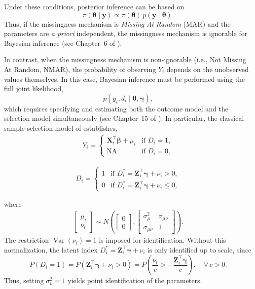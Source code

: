 Under these conditions, posterior inference can be based on
\[
\pi(\boldsymbol{\theta}\mid \mathbf{y}) 
\propto \pi(\boldsymbol{\theta})\, p(\mathbf{y} \mid \boldsymbol{\theta}).
\]
Thus, if the missingness mechanism is \textit{Missing At Random} (MAR) and the parameters are \emph{a priori} independent, the missingness mechanism is ignorable for Bayesian inference (see Chapter~6 of \cite{little2019statistical}).

In contrast, when the missingness mechanism is non-ignorable (i.e., Not Missing At Random, NMAR), the probability of observing $Y_i$ depends on the unobserved values themselves. In this case, Bayesian inference must be performed using the full joint likelihood,
\[
p(y_i, d_i \mid \boldsymbol{\theta},\boldsymbol{\gamma}),
\]
which requires specifying and estimating both the outcome model and the selection model simultaneously (see Chapter~15 of \cite{little2019statistical}). In particular, the classical sample selection model of \cite{heckman1979sample} establishes,
\begin{align*}
	Y_i = \begin{cases}
		\mathbf{X}_i^{\top}\boldsymbol{\beta}+\mu_i & \text{if } D_i=1, \\
		\text{NA} & \text{if } D_i=0,
	\end{cases}
\end{align*}

\begin{align*}
	D_i = \begin{cases}
		1 & \text{if } D_i^* = \mathbf{Z}_i^{\top}\boldsymbol{\gamma}+\nu_i > 0, \\
		0 & \text{if } D_i^* = \mathbf{Z}_i^{\top}\boldsymbol{\gamma}+\nu_i \leq 0,
	\end{cases}
\end{align*}

where
\begin{align}
	\begin{bmatrix}
		\mu_i \\[6pt]
		\nu_i
	\end{bmatrix}
	\sim N\!\left(
	\begin{bmatrix}
		0 \\ 0
	\end{bmatrix},
	\begin{bmatrix}
		\sigma^2_{\mu} & \sigma_{\mu\nu} \\
		\sigma_{\mu\nu} & 1
	\end{bmatrix}\right).
\end{align}
The restriction $\operatorname{Var}(\nu_i)=1$ is imposed for identification. 
Without this normalization, the latent index $D_i^*=\mathbf{Z}_i^{\top}\boldsymbol{\gamma}+\nu_i$ is only identified up to scale, since
\[
P(D_i=1) = P(\mathbf{Z}_i^{\top}\boldsymbol{\gamma}+\nu_i > 0) 
= P\!\left(\frac{\nu_i}{c} > -\frac{\mathbf{Z}_i^{\top}\boldsymbol{\gamma}}{c}\right),
\quad \forall\, c>0.
\]
Thus, setting $\sigma^2_{\nu}=1$ yields point identification of the parameters.

